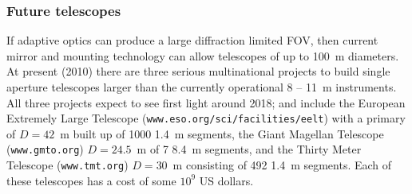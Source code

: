 \subsubsection{Future telescopes}

If adaptive optics can produce a large diffraction limited FOV, then current mirror and
mounting technology can allow telescopes of up to 100~m diameters. At present (2010)
there are three serious multinational projects to build single aperture telescopes larger 
than the currently operational 8 -- 11~m instruments. All three projects expect to see 
first light around 2018; and include the European Extremely Large Telescope 
({\tt www.eso.org/sci/facilities/eelt}) with a 
primary of $D=42$~m built up of 1000 1.4~m segments, the Giant Magellan Telescope
({\tt www.gmto.org})
$D=24.5$~m of 7 8.4~m segments, and the Thirty Meter Telescope 
({\tt www.tmt.org})
$D=30$~m consisting of 492 1.4~m segments. Each of these telescopes has a cost of
some $10^9$ US dollars.

%
